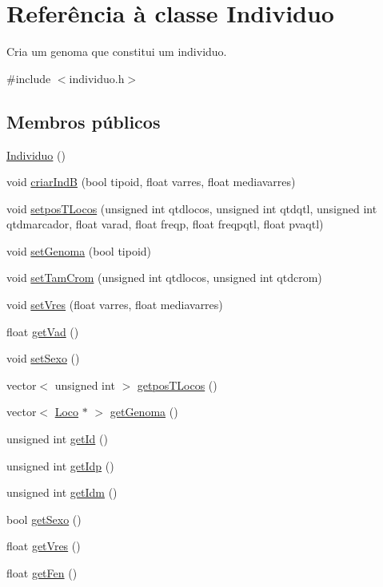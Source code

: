 \hypertarget{class_individuo}{\section{\-Referência à classe \-Individuo}
\label{class_individuo}
}


\-Cria um genoma que constitui um individuo.  




{\ttfamily \#include $<$individuo.\-h$>$}

\subsection*{\-Membros públicos}
\begin{DoxyCompactItemize}
\item 
\hyperlink{class_individuo_a3042a660b9789ee24dd3658248c8e0b9}{\-Individuo} ()
\item 
void \hyperlink{class_individuo_a93f10457d66068fe4e358a495d2e494c}{criar\-Ind\-B} (bool tipoid, float varres, float mediavarres)
\item 
void \hyperlink{class_individuo_ae89912e2bcf4391c30d6a5074f709c88}{setpos\-T\-Locos} (unsigned int qtdlocos, unsigned int qtdqtl, unsigned int qtdmarcador, float varad, float freqp, float freqpqtl, float pvaqtl)
\item 
void \hyperlink{class_individuo_a1641427ff59310a53fc0076e519102c6}{set\-Genoma} (bool tipoid)
\item 
void \hyperlink{class_individuo_a2366e00f66ed23bd142a1d63509098e4}{set\-Tam\-Crom} (unsigned int qtdlocos, unsigned int qtdcrom)
\item 
void \hyperlink{class_individuo_a3271e903e8edcb3bac726a0b3ff1d1a7}{set\-Vres} (float varres, float mediavarres)
\item 
float \hyperlink{class_individuo_a602f0cf13154ca33b265b7d59b494ed3}{get\-Vad} ()
\item 
void \hyperlink{class_individuo_a40f1b7aaf7abc0e1e272eab2e7074fbd}{set\-Sexo} ()
\item 
vector$<$ unsigned int $>$ \hyperlink{class_individuo_a7aae9dafaa8ffebe2c20bd73ef7133cc}{getpos\-T\-Locos} ()
\item 
vector$<$ \hyperlink{class_loco}{\-Loco} $\ast$ $>$ \hyperlink{class_individuo_ac724222b106e77476ee0247ad170383d}{get\-Genoma} ()
\item 
unsigned int \hyperlink{class_individuo_a17aa04fe0128e944416d52d7c1867638}{get\-Id} ()
\item 
unsigned int \hyperlink{class_individuo_a43a77e5804d60b1943799e0299d34357}{get\-Idp} ()
\item 
unsigned int \hyperlink{class_individuo_a60ec384d3937146ab8353d3ebc715f6b}{get\-Idm} ()
\item 
bool \hyperlink{class_individuo_af6b53d0812f8ed281de665877a256498}{get\-Sexo} ()
\item 
float \hyperlink{class_individuo_a205f982134fd0df2f951946743e1c2b6}{get\-Vres} ()
\item 
float \hyperlink{class_individuo_a7a18d46c7f802c31a353db09035e2f2b}{get\-Fen} ()
\end{DoxyCompactItemize}


